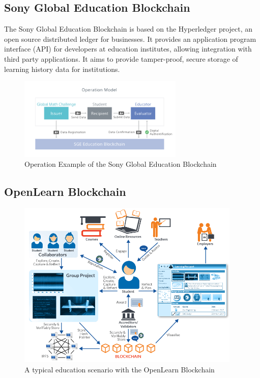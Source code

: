 \subsection{Sony Global Education Blockchain}%

The Sony Global Education Blockchain is based on the Hyperledger project, an open source distributed ledger
for businesses. It provides an application program interface (API) for developers at education institutes,
allowing integration with third party applications. It aims to provide tamper-proof, secure storage of
learning history data for institutions. \citep{sonyged2017}

\begin{figure}[!ht]
	\centering
	\includegraphics[width=0.7\textwidth]{sonyged}
	\caption[Sony Global Education Blockchain]
	{Operation Example of the Sony Global Education Blockchain \citep{sonyged2017}}
	\label{fig:sonyged}
\end{figure}

\subsection{OpenLearn Blockchain}%

\begin{figure}[!ht]
	\centering
	\includegraphics[width=0.95\textwidth]{openlearn}
	\caption[OpenLearn Blockchain scenario]
	{A typical education scenario with the OpenLearn Blockchain \citep{openlearn2018}}
	\label{fig:openlearn}
\end{figure}

